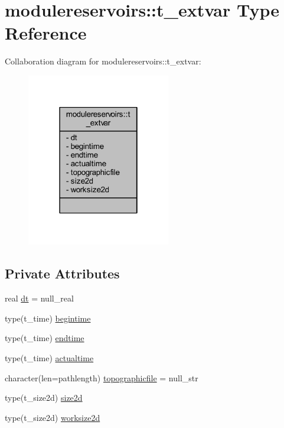 \hypertarget{structmodulereservoirs_1_1t__extvar}{}\section{modulereservoirs\+:\+:t\+\_\+extvar Type Reference}
\label{structmodulereservoirs_1_1t__extvar}


Collaboration diagram for modulereservoirs\+:\+:t\+\_\+extvar\+:\nopagebreak
\begin{figure}[H]
\begin{center}
\leavevmode
\includegraphics[width=178pt]{structmodulereservoirs_1_1t__extvar__coll__graph}
\end{center}
\end{figure}
\subsection*{Private Attributes}
\begin{DoxyCompactItemize}
\item 
real \mbox{\hyperlink{structmodulereservoirs_1_1t__extvar_ac009bcaec042e48451ccd63d11ef0195}{dt}} = null\+\_\+real
\item 
type(t\+\_\+time) \mbox{\hyperlink{structmodulereservoirs_1_1t__extvar_a8fe735a61247a5a06cf496d6e35161f9}{begintime}}
\item 
type(t\+\_\+time) \mbox{\hyperlink{structmodulereservoirs_1_1t__extvar_ab903daab6c7b9429ffe7549a5fe417b5}{endtime}}
\item 
type(t\+\_\+time) \mbox{\hyperlink{structmodulereservoirs_1_1t__extvar_a6c08f81139a0f80f41936a1a5e5be805}{actualtime}}
\item 
character(len=pathlength) \mbox{\hyperlink{structmodulereservoirs_1_1t__extvar_accfd4a90129f98fdd22fdb1f1ddefddb}{topographicfile}} = null\+\_\+str
\item 
type(t\+\_\+size2d) \mbox{\hyperlink{structmodulereservoirs_1_1t__extvar_a53a4fce9b82271e1b84d8122345a71a3}{size2d}}
\item 
type(t\+\_\+size2d) \mbox{\hyperlink{structmodulereservoirs_1_1t__extvar_a0cf9bc01ea1d6b7eaa1951235bf38dc9}{worksize2d}}
\end{DoxyCompactItemize}


